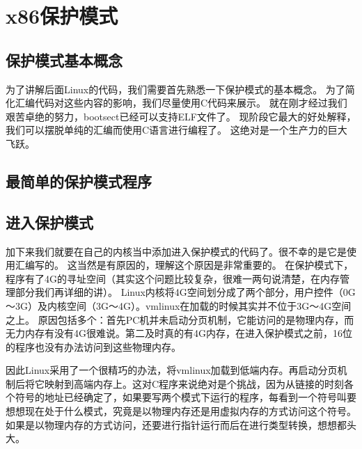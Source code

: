 \chapter{x86保护模式}
\section{保护模式基本概念}
为了讲解后面Linux的代码，我们需要首先熟悉一下保护模式的基本概念。
为了简化汇编代码对这些内容的影响，我们尽量使用C代码来展示。
就在刚才经过我们艰苦卓绝的努力，bootsect已经可以支持ELF文件了。
现阶段它最大的好处解释，我们可以摆脱单纯的汇编而使用C语言进行编程了。
这绝对是一个生产力的巨大飞跃。

\section{最简单的保护模式程序}

\section{进入保护模式}
加下来我们就要在自己的内核当中添加进入保护模式的代码了。很不幸的是它是使用汇编写的。
这当然是有原因的，理解这个原因是非常重要的。
在保护模式下，程序有了4G的寻址空间（其实这个问题比较复杂，很难一两句说清楚，在内存管理部分我们再详细的讲）。
Linux内核将4G空间划分成了两个部分，用户控件（0G～3G）及内核空间（3G～4G）。vmlinux在加载的时候其实并不位于3G～4G空间之上。
原因包括多个：首先PC机并未启动分页机制，它能访问的是物理内存，而无力内存有没有4G很难说。第二及时真的有4G内存，在进入保护模式之前，16位的程序也没有办法访问到这些物理内存。

因此Linux采用了一个很精巧的办法，将vmlinux加载到低端内存。再启动分页机制后将它映射到高端内存上。这对C程序来说绝对是个挑战，因为从链接的时刻各个符号的地址已经确定了，如果要写两个模式下运行的程序，每看到一个符号叫要想想现在处于什么模式，究竟是以物理内存还是用虚拟内存的方式访问这个符号。如果是以物理内存的方式访问，还要进行指针运行而后在进行类型转换，想想都头大。

